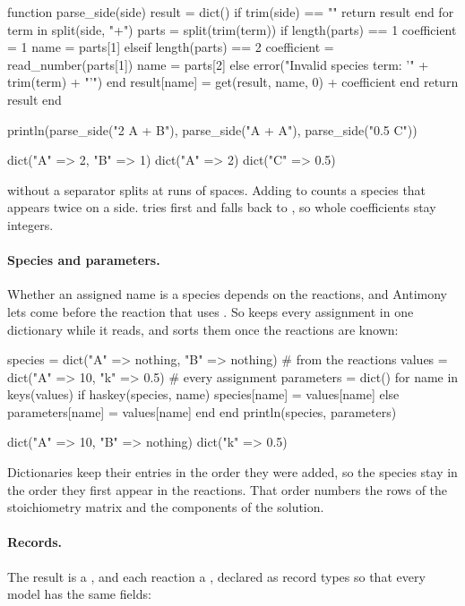 \documentclass[11pt,a4paper,openany]{report}
\begin{document}
{{\begin{axon}
function parse_side(side)
  result = dict()
  if trim(side) == ""
    return result
  end
  for term in split(side, "+")
    parts = split(trim(term))
    if length(parts) == 1
      coefficient = 1
      name = parts[1]
    elseif length(parts) == 2
      coefficient = read_number(parts[1])
      name = parts[2]
    else
      error("Invalid species term: '" + trim(term) + "'")
    end
    result[name] = get(result, name, 0) + coefficient
  end
  return result
end

println(parse_side("2 A + B"), parse_side("A + A"), parse_side("0.5 C"))
\end{axon}
\begin{axonout}
dict("A" => 2, "B" => 1) dict("A" => 2) dict("C" => 0.5)
\end{axonout}

 without a separator splits at runs of spaces. Adding to
 counts a species that appears twice on a side.
 tries  first and falls back to , so
whole coefficients stay integers.

\paragraph{Species and parameters.} Whether an assigned name is a species
depends on the reactions, and Antimony lets  come before the
reaction that uses . So  keeps every assignment in one
dictionary while it reads, and sorts them once the reactions are known:

\begin{axon}
species = dict("A" => nothing, "B" => nothing)   # from the reactions
values = dict("A" => 10, "k" => 0.5)              # every assignment
parameters = dict()
for name in keys(values)
  if haskey(species, name)
    species[name] = values[name]
  else
    parameters[name] = values[name]
  end
end
println(species, parameters)
\end{axon}
\begin{axonout}
dict("A" => 10, "B" => nothing) dict("k" => 0.5)
\end{axonout}

Dictionaries keep their entries in the order they were added, so the species
stay in the order they first appear in the reactions. That order numbers the
rows of the stoichiometry matrix and the components of the solution.

\paragraph{Records.} The result is a , and each reaction a
, declared as record types so that every model has the same
fields:

}}
\end{document}
